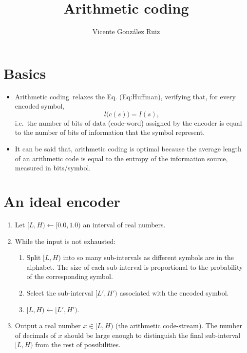 \title{Arithmetic coding}
\author{Vicente González Ruiz}
\maketitle
\tableofcontents

\section{Basics}

\begin{itemize}
\tightlist
\item
  Arithmetic coding~\cite{rissanen1979arithmetic, witten1987arithmetic}relaxes the Eq. (Eq:Huffman), verifying that, for
  every encoded symbol, \begin{equation}
    l\big(c(s)\big) = I(s), \tag{Eq:arithmetic}
  \end{equation} i.e.~the number of bits of data (code-word) assigned by
  the encoder is equal to the number of bits of information that the
  symbol represent.
\end{itemize}


\begin{itemize}
\tightlist
\item
  It can be said that, arithmetic coding is optimal because the average
  length of an arithmetic code is equal to the entropy of the
  information source, measured in bits/symbol.
\end{itemize}

\section{An ideal encoder}
\begin{enumerate}
\def\labelenumi{\arabic{enumi}.}
\tightlist
\item
  Let \([L,H)\leftarrow [0.0,1.0)\) an interval of real numbers.
\item
  While the input is not exhausted:
  \begin{enumerate}
  \def\labelenumii{\arabic{enumii}.}
  \tightlist
  \item
    Split \([L,H)\) into so many sub-intervals as different symbols are
    in the alphabet. The size of each sub-interval is proportional to
    the probability of the corresponding symbol.
  \item
    Select the sub-interval \([L',H')\) associated with the encoded
    symbol.
  \item
    \([L,H)\leftarrow [L',H')\).
  \end{enumerate}
\item
  Output a real number \(x\in[L,H)\) (the arithmetic code-stream). The
  number of decimals of \(x\) should be large enough to distinguish the
  final sub-interval \([L,H)\) from the rest of possibilities.
\end{enumerate}


